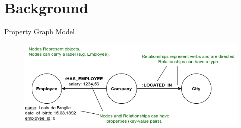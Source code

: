 \documentclass[rgb]{beamer}
\begin{document}
    \section{Background}
        \begin{frame}{Property Graph Model}
            \begin{figure}
                \begin{center}
                \includegraphics[keepaspectratio, height=0.8\textheight, width=.8\textwidth]{img/property_graph_elements.png}
                \end{center}
            \end{figure}
        \end{frame}
        
\end{document}
